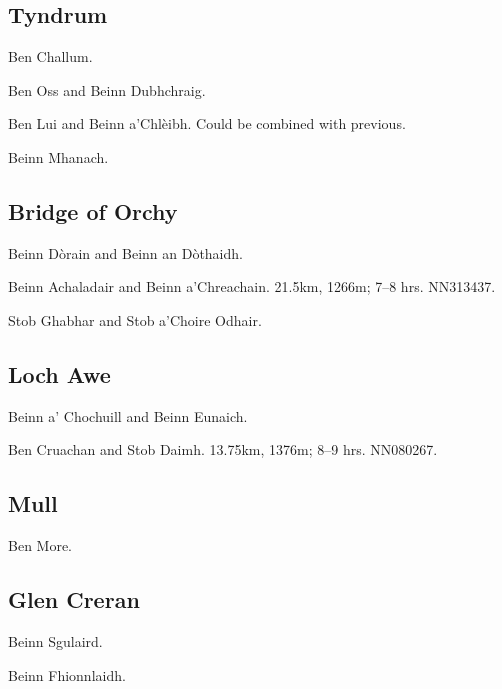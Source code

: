
\subsection{Tyndrum}

\begin{munros}
\item Ben Challum.

\item Ben Oss and Beinn Dubhchraig.

\item\target Ben Lui and Beinn a'Chlèibh.  Could be combined with previous. 

\item Beinn Mhanach.
\end{munros}


\subsection{Bridge of Orchy}

\begin{munros}
\item Beinn Dòrain and Beinn an Dòthaidh.

\item \target Beinn Achaladair and Beinn a'Chreachain.  21.5km, 1266m; 7--8
  hrs.  NN313437.

\item Stob Ghabhar and Stob a'Choire Odhair.

\end{munros}


\subsection{Loch Awe}

\begin{munros}
\item Beinn a' Chochuill and Beinn Eunaich.

\item \target\tick Ben Cruachan and Stob Daimh.  13.75km, 1376m; 8--9 hrs.
  NN080267. 
\end{munros}


\subsection{Mull}

\begin{munros}
\item Ben More.
\end{munros}


\subsection{Glen Creran}

\begin{munros}
\item Beinn Sgulaird.

\item Beinn Fhionnlaidh.
\end{munros}
